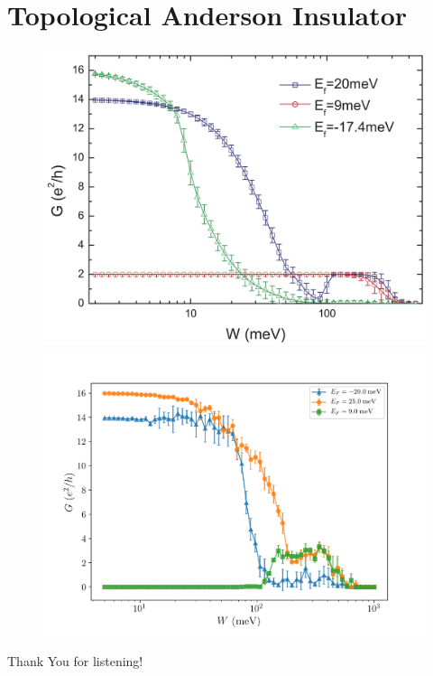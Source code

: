 \documentclass[12pt]{article}
\numberwithin{equation}{section}
\begin{document}
\newpage
\section*{Topological Anderson Insulator}
\begin{figure}[h!]
  \centering
  \begin{minipage}{0.49\textwidth}
    \centering
    \includegraphics[width=1.0\textwidth]{./media/tai_results_from_article.png} %
\end{minipage}\hfill
  \begin{minipage}{0.49\textwidth}
      \centering
      \includegraphics[width=1.0\textwidth]{./media/tai_results_params1_nsamples=4.png} %
  \end{minipage}
\end{figure}

\newpage
\nocite{*}



\newpage
{}
\vspace*{\fill}
\begin{center}
    \LARGE{Thank You for listening!}
\end{center}
\vspace*{\fill}
\end{document}
